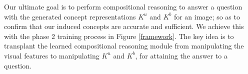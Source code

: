 \documentclass[10pt,twocolumn,letterpaper]{article}
\begin{document}
Our ultimate goal is to perform compositional reasoning to answer a question with the generated concept representations $K^u$ and $K^b$ for an image; so as to confirm that our induced concepts are accurate and sufficient. We achieve this with the phase 2 training process in Figure \ref{framework}.
The key idea is to transplant the learned compositional reasoning module from manipulating the visual features to manipulating $K^u$ and $K^b$, for attaining the answer to a question.


\begin{figure*}
\vspace{-2mm}
\label{sota_comp}


\end{figure*}
\end{document}
